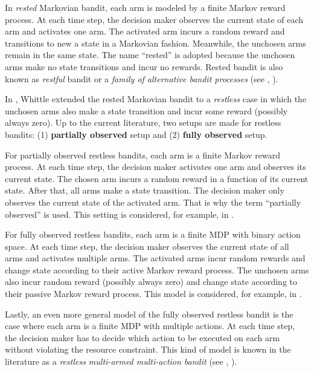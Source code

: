 In \emph{rested} Markovian bandit, each arm is modeled by a finite Markov reward process. At each time step, the decision maker observes the current state of each arm and activates one arm.
The activated arm incurs a random reward and transitions to new a state in a Markovian fashion.
Meanwhile, the unchosen arms remain in the same state.
The name ``rested'' is adopted because the unchosen arms make no state transitions and incur no rewards.
Rested bandit is also known as \emph{restful} bandit or a \emph{family of alternative bandit processes} (see \eg, \cite{gittins1979bandit,katehakis1987multi,duff1995q,tekin2010online,gittins2011multi}).

In \cite{whittle1988restless}, Whittle extended the rested Markovian bandit to a \emph{restless} case in which
the unchosen arms also make a state transition and incur some reward (possibly always zero).
Up to the current literature, two setups are made for restless bandits: (1) \textbf{partially observed} setup and (2) \textbf{fully observed} setup.

For partially observed restless bandits, each arm is a finite Markov reward process.
At each time step, the decision maker activates one arm and observes its current state.
The chosen arm incurs a random reward in a function of its current state.
After that, all arms make a state transition.
The decision maker only observes the current state of the activated arm.
That is why the term ``partially observed'' is used.
This setting is considered, for example, in \cite{ahmad2009multi,ortner2012regret, jung2019regret, akbarzadeh2019dynamic, wang2020restless}.

For fully observed restless bandits, each arm is a finite MDP with binary action space.
At each time step, the decision maker observes the current state of all arms and activates multiple arms.
The activated arms incur random rewards and change state according to their active Markov reward process.
The unchosen arms also incur random reward (possibly always zero) and change state according to their passive Markov reward process.
This model is considered, for example, in \cite{whittle1996optimal,akbarzadeh2019restless,gast2020exponential,dahiya2022scalable}.

Lastly, an even more general model of the fully observed restless bandit is the case where each arm is a finite MDP with multiple actions.
At each time step, the decision maker has to decide which action to be executed on each arm without violating the resource constraint.
This kind of model is known in the literature as a \emph{restless multi-armed multi-action bandit} (see \eg, \cite{hodge2015asymptotic,killian2021beyond}).


